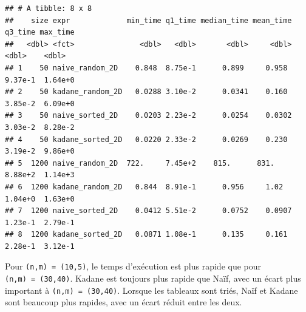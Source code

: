 \documentclass[
]{article}
\begin{document}
\begin{verbatim}
## # A tibble: 8 x 8
##    size expr             min_time q1_time median_time mean_time q3_time max_time
##   <dbl> <fct>               <dbl>   <dbl>       <dbl>     <dbl>   <dbl>    <dbl>
## 1    50 naive_random_2D    0.848  8.75e-1      0.899     0.958  9.37e-1  1.64e+0
## 2    50 kadane_random_2D   0.0288 3.10e-2      0.0341    0.160  3.85e-2  6.09e+0
## 3    50 naive_sorted_2D    0.0203 2.23e-2      0.0254    0.0302 3.03e-2  8.28e-2
## 4    50 kadane_sorted_2D   0.0220 2.33e-2      0.0269    0.230  3.19e-2  9.86e+0
## 5  1200 naive_random_2D  722.     7.45e+2    815.      831.     8.88e+2  1.14e+3
## 6  1200 kadane_random_2D   0.844  8.91e-1      0.956     1.02   1.04e+0  1.63e+0
## 7  1200 naive_sorted_2D    0.0412 5.51e-2      0.0752    0.0907 1.23e-1  2.79e-1
## 8  1200 kadane_sorted_2D   0.0871 1.08e-1      0.135     0.161  2.28e-1  3.12e-1
\end{verbatim}

Pour \texttt{(n,m)\ =\ (10,5)}, le temps d'exécution est plus rapide que
pour \texttt{(n,m)\ =\ (30,40)}. Kadane est toujours plus rapide que
Naïf, avec un écart plus important à \texttt{(n,m)\ =\ (30,40)}. Lorsque
les tableaux sont triés, Naïf et Kadane sont beaucoup plus rapides, avec
un écart réduit entre les deux.
\end{document}
